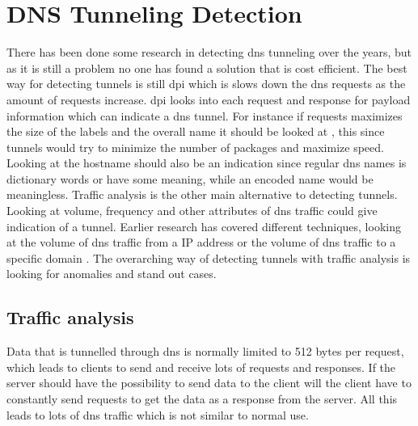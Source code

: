 \chapter{DNS Tunneling Detection}
\label{chp:dns_detection}

There has been done some research in detecting \Gls{dns} tunneling over the years, but as it is still a problem no one has found a solution that is cost efficient. The best way for detecting tunnels is still \Gls{dpi} which is slows down the \Gls{dns} requests as the amount of requests increase. \Gls{dpi} looks into each request and response for payload information which can indicate a \Gls{dns} tunnel. For instance if requests maximizes the size of the labels and the overall name it should be looked at \cite{farnham2013detecting}, this since tunnels would try to minimize the number of packages and maximize speed. Looking at the hostname should also be an indication since regular \Gls{dns} names is dictionary words or have some meaning, while an encoded name would be meaningless. Traffic analysis is the other main alternative to detecting tunnels. Looking at volume, frequency and other attributes of \Gls{dns} traffic could give indication of a tunnel. Earlier research has covered different techniques, looking at the volume of \Gls{dns} traffic from a IP address or the volume of \Gls{dns} traffic to a specific domain \cite{farnham2013detecting}. The overarching way of detecting tunnels with traffic analysis is looking for anomalies and stand out cases.

\section{Traffic analysis}
Data that is tunnelled through \Gls{dns} is normally limited to 512 bytes per request, which leads to clients to send and receive lots of requests and responses. If the server should have the possibility to send data to the client will the client have to constantly send requests to get the data as a response from the server. All this leads to lots of \Gls{dns} traffic which is not similar to normal use.
